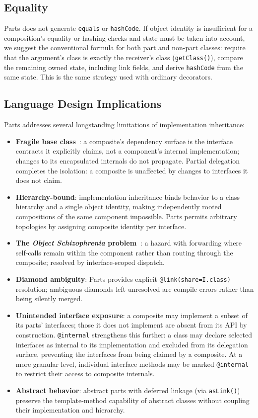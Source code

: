 \documentclass[acmsmall,nonacm]{acmart}
\theoremstyle{acmplain}
\newcommand{\code}[1]{\texttt{#1}}
\begin{document}
\subsection{Equality}
Parts does not generate \code{equals} or \code{hashCode}. If object identity is insufficient for a composition's equality
or hashing checks and state must be taken into account, we suggest the conventional formula for both part and non-part classes:
require that the argument's class is exactly the receiver's class (\code{getClass()}), compare the remaining owned state,
including link fields, and derive \code{hashCode} from the same state. This is the same strategy used with ordinary decorators.

\subsection{Language Design Implications}

Parts addresses several longstanding limitations of implementation inheritance:

\begin{itemize}
  \item \textbf{Fragile base class}~\cite{mikhajlov1998}: a composite's dependency surface is the interface contracts it
        explicitly claims, not a component's internal implementation; changes to its encapsulated internals do not propagate.
        Partial delegation completes the isolation: a composite is unaffected by changes to interfaces it does not claim.
  \item \textbf{Hierarchy-bound}: implementation inheritance binds behavior to a class hierarchy and a single object identity,
        making independently rooted compositions of the same component impossible. Parts permits arbitrary topologies by
        assigning composite identity per interface.
  \item \textbf{The \emph{Object Schizophrenia} problem~\cite{sekharaiah2002}}: a hazard with forwarding where self-calls
        remain within the component rather than routing through the composite; resolved by interface-scoped dispatch.
  \item \textbf{Diamond ambiguity}: Parts provides explicit \code{@link(share=I.class)} resolution; ambiguous diamonds left
        unresolved are compile errors rather than being silently merged.
  \item \textbf{Unintended interface exposure}: a composite may implement a subset of its parts' interfaces; those it does
        not implement are absent from its API by construction. \code{@internal} strengthens this further: a class may declare selected
        interfaces as internal to its implementation and excluded from its delegation surface, preventing the
        interfaces from being claimed by a composite. At a more granular level, individual interface methods may be marked
        \code{@internal} to restrict their access to composite internals.
  \item \textbf{Abstract behavior}: abstract parts with deferred linkage (via \code{asLink()}) preserve the template-method
        capability of abstract classes without coupling their implementation and hierarchy.
\end{itemize}
\end{document}
